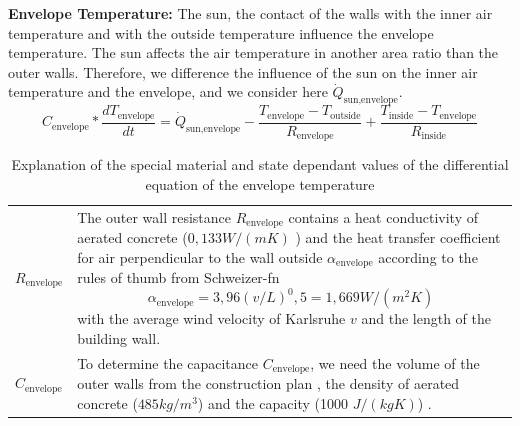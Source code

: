     \textbf{Envelope Temperature:}\newline
    The sun, the contact of the walls with the inner air temperature and with the outside temperature influence the envelope temperature. The sun affects the air temperature in another area ratio than the outer walls. Therefore, we difference the influence of the sun on the inner air temperature and the envelope, and we consider here $\dot{Q}_\text{sun,envelope}$.  
    \begin{equation}
    \label{eq:diffEnvelope}
        C_\text{envelope}*\frac{d T_\text{envelope}}{d t} = \dot{Q}_\text{sun,envelope} - \frac{T_\text{envelope}-T_\text{outside}}{R_\text{envelope}} + \frac{T_\text{inside}-T_\text{envelope}}{R_\text{inside}}
    \end{equation}
    \begin{table}[H]
        \centering
        \begin{tabular}{l p{13cm}}
        $R_\text{envelope}$ & The outer wall resistance $R_\text{envelope}$ contains a heat conductivity of aerated concrete ($0,133 W/(m K)$ \cite{GhaziWakili.2015}) and the heat transfer coefficient for air perpendicular to the wall outside $\alpha_\text{envelope}$ according to the rules of thumb from Schweizer-fn \cite{Schweizer-fnalpha}
    \begin{equation}
        \alpha_\text{envelope} = 3,96 (v / L)^0,5 = 1,669 W/(m^2 K)
    \end{equation}
    with the average wind velocity of Karlsruhe $v$ \cite{AbteilungKlimaundUmweltberatung.2004} and the length of the building wall.  \\
        $C_\text{envelope}$ & To determine the capacitance $C_\text{envelope}$, we need the volume of the outer walls from the construction plan \cite{Bauplan}, the density of aerated concrete ($485 kg/m^3$) and the capacity (1000 $J/(kg K)$) \cite{GhaziWakili.2015}. 
        \end{tabular}
        \caption{Explanation of the special material and state dependant values of the differential equation of the envelope temperature}
        \label{tab:valuesOfEnvelopeTemperature}
    \end{table}
   
